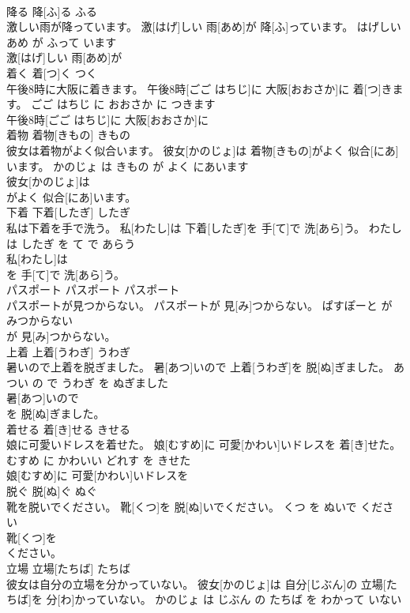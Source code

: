 \documentclass[8pt]{extreport}
\begin{document}
\begin{CJK}{UTF8}{min}
\\	降る	降[ふ]る	ふる	
\\	激しい雨が降っています。	激[はげ]しい 雨[あめ]が 降[ふ]っています。	はげしい あめ が ふって います	
\\	激[はげ]しい 雨[あめ]が
\\	着く	着[つ]く	つく	
\\	午後8時に大阪に着きます。	午後8時[ごご はちじ]に 大阪[おおさか]に 着[つ]きます。	ごご はちじ に おおさか に つきます	
\\	午後8時[ごご はちじ]に 大阪[おおさか]に
\\	着物	着物[きもの]	きもの	
\\	彼女は着物がよく似合います。	彼女[かのじょ]は 着物[きもの]がよく 似合[にあ]います。	かのじょ は きもの が よく にあいます	
\\	彼女[かのじょ]は
\\	がよく 似合[にあ]います。			
\\	下着	下着[したぎ]	したぎ	
\\	私は下着を手で洗う。	私[わたし]は 下着[したぎ]を 手[て]で 洗[あら]う。	わたし は したぎ を て で あらう	
\\	私[わたし]は
\\	を 手[て]で 洗[あら]う。			
\\	パスポート	パスポート	パスポート	
\\	パスポートが見つからない。	パスポートが 見[み]つからない。	ぱすぽーと が みつからない	
\\	が 見[み]つからない。			
\\	上着	上着[うわぎ]	うわぎ	
\\	暑いので上着を脱ぎました。	暑[あつ]いので 上着[うわぎ]を 脱[ぬ]ぎました。	あつい の で うわぎ を ぬぎました	
\\	暑[あつ]いので
\\	を 脱[ぬ]ぎました。			
\\	着せる	着[き]せる	きせる	
\\	娘に可愛いドレスを着せた。	娘[むすめ]に 可愛[かわい]いドレスを 着[き]せた。	むすめ に かわいい どれす を きせた	
\\	娘[むすめ]に 可愛[かわい]いドレスを
\\	脱ぐ	脱[ぬ]ぐ	ぬぐ	
\\	靴を脱いでください。	靴[くつ]を 脱[ぬ]いでください。	くつ を ぬいで ください	
\\	靴[くつ]を
\\	ください。			
\\	立場	立場[たちば]	たちば	
\\	彼女は自分の立場を分かっていない。	彼女[かのじょ]は 自分[じぶん]の 立場[たちば]を 分[わ]かっていない。	かのじょ は じぶん の たちば を わかって いない	

\end{CJK}
\end{document}
